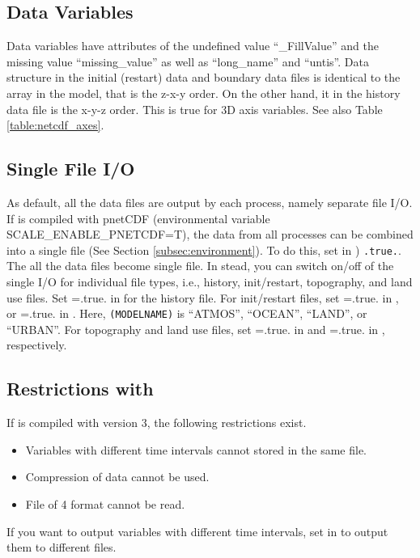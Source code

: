 \subsection{Data Variables}
Data variables have attributes of the undefined value ``\_FillValue'' and 
the missing value ``missing\_value'' as well as ``long\_name'' and ``untis''.
Data structure in the initial (restart) data and boundary data files 
is identical to the array in the model, that is the z-x-y order.
On the other hand, it in the history data file is the x-y-z order.
This is true for 3D axis variables.
See also Table \ref{table:netcdf_axes}.



\subsection{Single File I/O} \label{subsec:single_io}
As default, all the data files are output by each process, namely separate file I/O.
If \scalerm is compiled with pnetCDF (environmental variable SCALE\_ENABLE\_PNETCDF=T),
the data from all processes can be combined into a single file (See Section \ref{subsec:environment}).
To do this, set  in ) \verb|.true.|. The all the data files become single file.
In stead, you can switch on/off of the single I/O for individual file types, i.e., history, init/restart, topography, and land use files.
Set =.true. in  for the history file.
For init/restart files, set =.true. in ,\\
or =.true. in .
Here, \verb|(MODELNAME)| is ``ATMOS'', ``OCEAN'', ``LAND'', or ``URBAN''.
For topography and land use files, set =.true. in  and =.true. in , respectively.


\subsection{Restrictions with }
If \scale is compiled with \netcdf version 3, the following restrictions exist.
\begin{itemize}
\item Variables with different time intervals cannot stored in the same file.
\item Compression of data cannot be used.
\item File of {\netcdf}4 format cannot be read.
\end{itemize}
If you want to output variables with different time intervals, set  in  to output them to different files.

